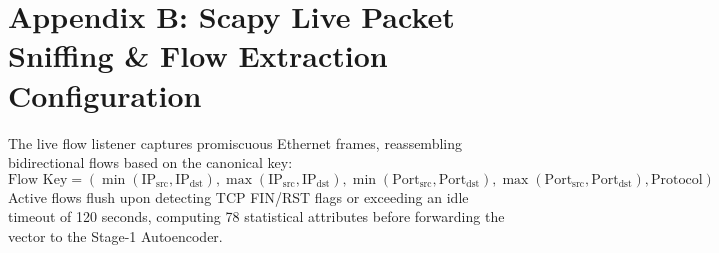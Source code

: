 \documentclass[12pt,a4paper]{report}
\begin{document}
\section*{Appendix B: Scapy Live Packet Sniffing \& Flow Extraction Configuration}
The live flow listener captures promiscuous Ethernet frames, reassembling bidirectional flows based on the canonical key:
\begin{equation}
\text{Flow Key} = \left(\min(\text{IP}_{\text{src}}, \text{IP}_{\text{dst}}), \max(\text{IP}_{\text{src}}, \text{IP}_{\text{dst}}), \min(\text{Port}_{\text{src}}, \text{Port}_{\text{dst}}), \max(\text{Port}_{\text{src}}, \text{Port}_{\text{dst}}), \text{Protocol}\right)
\label{eq:app_flowkey}
\end{equation}
Active flows flush upon detecting TCP FIN/RST flags or exceeding an idle timeout of 120 seconds, computing 78 statistical attributes before forwarding the vector to the Stage-1 Autoencoder.
\end{document}
